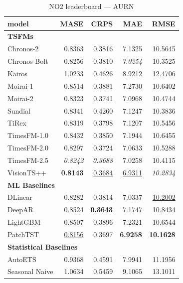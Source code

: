 \begin{table}[H]
\caption{NO2 leaderboard --- AURN}
\centering
\begin{small}
\begin{tabular}{lrrrr}
\toprule
model & MASE & CRPS & MAE & RMSE \\
\midrule
\multicolumn{5}{l}{\textbf{TSFMs}} \\
Chronos-2 & 0.8363 & 0.3816 & 7.1325 & 10.5645 \\
Chronos-Bolt & 0.8256 & 0.3810 & \textit{7.0254} & 10.3525 \\
Kairos & 1.0233 & 0.4626 & 8.9212 & 12.4706 \\
Moirai-1 & 0.8514 & 0.3881 & 7.2730 & 10.6402 \\
Moirai-2 & 0.8323 & 0.3741 & 7.0968 & 10.4744 \\
Sundial & 0.8341 & 0.4260 & 7.1247 & 10.3836 \\
TiRex & 0.8319 & 0.3798 & 7.1207 & 10.5456 \\
TimesFM-1.0 & 0.8432 & 0.3850 & 7.1944 & 10.6455 \\
TimesFM-2.0 & 0.8297 & 0.3724 & 7.0633 & 10.5288 \\
TimesFM-2.5 & \textit{0.8242} & \textit{0.3688} & 7.0258 & 10.4115 \\
VisionTS++ & \textbf{0.8143} & \underline{0.3684} & \underline{6.9311} & \textit{10.2834} \\
\midrule
\multicolumn{5}{l}{\textbf{ML Baselines}} \\
DLinear & 0.8282 & 0.3814 & 7.0337 & \underline{10.2002} \\
DeepAR & 0.8524 & \textbf{0.3643} & 7.1747 & 10.8434 \\
LightGBM & 0.8507 & 0.3896 & 7.2321 & 10.6544 \\
PatchTST & \underline{0.8156} & 0.3697 & \textbf{6.9258} & \textbf{10.1628} \\
\midrule
\multicolumn{5}{l}{\textbf{Statistical Baselines}} \\
AutoETS & 0.9368 & 0.4591 & 7.9941 & 11.1956 \\
Seasonal Naive & 1.0634 & 0.5459 & 9.1065 & 13.1011 \\
\bottomrule
\end{tabular}
\end{small}
\end{table}